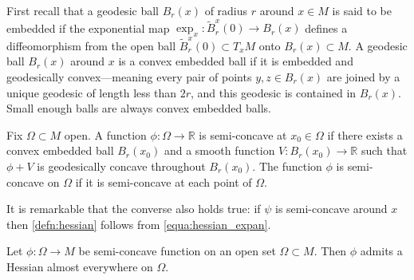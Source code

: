 First recall that a geodesic ball \( B _ { r } ( x ) \) of radius \( r \) around \( x \in M \) is said to be embedded
if the exponential map \( \exp _ { x } : \tilde { B } _ { r } ^ { x } ( 0 ) \rightarrow B _ { r } ( x ) \) defines
a diffeomorphism from the open ball \( \tilde { B } _ { r } ^ { x } ( 0 ) \subset T _ { x } M \) onto \( B _ { r } ( x ) \subset M \).
A geodesic ball \( B _ { r } ( x ) \) around \( x \) is a convex embedded ball
if it is embedded and geodesically convex---meaning every pair of points \( y , z \in B _ { r } ( x ) \)
are joined by a unique geodesic of length less than \( 2 r \),
and this geodesic is contained in \( B _ { r } ( x )\).
Small enough balls are always convex embedded balls.

\begin{defn}
	\label{defn:semi-concavity}
	Fix \( \Omega \subset M \) open.
	A function \( \phi : \Omega \rightarrow \mathbb { R } \) is semi-concave at \( x _ { 0 } \in \Omega \)
	if there exists a convex embedded ball \( B _ { r } \left( x _ { 0 } \right) \) and
	a smooth function \( V : B _ { r } \left( x _ { 0 } \right) \rightarrow \mathbb { R } \)
	such that \( \phi + V \) is geodesically concave throughout \( B _ { r } \left( x _ { 0 } \right)\).
	The function \( \phi \) is semi-concave on \( \Omega \) if
	it is semi-concave at each point of \( \Omega \).
\end{defn}

It is remarkable that the converse also holds true: if \( \psi \) is semi-concave around \( x \) then \cref{defn:hessian} follows from \cref{equa:hessian_expan}.


\begin{thm}
	Let \( \phi : \Omega \rightarrow M \) be semi-concave function on an open set \( \Omega \subset M . \) Then \( \phi \) admits a Hessian almost everywhere on \( \Omega \).
\end{thm}


